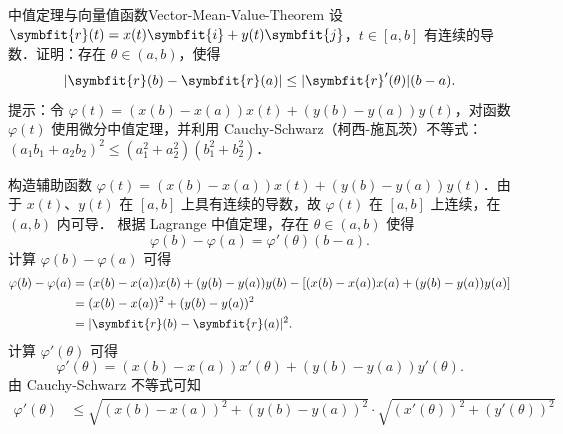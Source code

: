 \begin{problem}{中值定理与向量值函数}{Vector-Mean-Value-Theorem}
    设 $\symbfit{r}(t) = x(t)\symbfit{i} + y(t)\symbfit{j}$，$t \in [a, b]$ 有连续的导数．证明：存在 $\theta \in (a, b)$，使得
    \begin{equation}
        |\symbfit{r}(b) - \symbfit{r}(a)| \le |\symbfit{r}'(\theta)|(b - a). \label{eq:target-inequality}
    \end{equation}
    提示：令 $\varphi(t) = (x(b) - x(a))x(t) + (y(b) - y(a))y(t)$，对函数 $\varphi(t)$ 使用微分中值定理，并利用 Cauchy-Schwarz（柯西-施瓦茨）不等式：$(a_1b_1 + a_2b_2)^2 \le (a_1^2 + a_2^2)(b_1^2 + b_2^2)$．
\end{problem}

\begin{myproof}

    构造辅助函数 $\varphi(t) = (x(b) - x(a))x(t) + (y(b) - y(a))y(t)$．由于 $x(t)$、$y(t)$ 在 $[a, b]$ 上具有连续的导数，故 $\varphi(t)$ 在 $[a, b]$ 上连续，在 $(a, b)$ 内可导．
    根据 Lagrange 中值定理，存在 $\theta \in (a, b)$ 使得
    \begin{equation}
        \varphi(b) - \varphi(a) = \varphi'(\theta)(b - a). \label{eq:lagrange}
    \end{equation}
    计算 $\varphi(b) - \varphi(a)$ 可得
    \begin{equation}
        \begin{aligned}
            \varphi(b) - \varphi(a) & = (x(b) - x(a))x(b) + (y(b) - y(a))y(b) - \left[ (x(b) - x(a))x(a) + (y(b) - y(a))y(a) \right] \\
                                    & = (x(b) - x(a))^2 + (y(b) - y(a))^2                                                            \\
                                    & = |\symbfit{r}(b) - \symbfit{r}(a)|^2.
        \end{aligned} \label{eq:left-side}
    \end{equation}
    计算 $\varphi'(\theta)$ 可得
    \begin{equation}
        \varphi'(\theta) = (x(b) - x(a))x'(\theta) + (y(b) - y(a))y'(\theta). \label{eq:derivative}
    \end{equation}
    由 Cauchy-Schwarz 不等式可知
    \begin{equation}
        \begin{aligned}
            \varphi'(\theta) & \le \sqrt{(x(b) - x(a))^2 + (y(b) - y(a))^2} \cdot \sqrt{(x'(\theta))^2 + (y'(\theta))^2} \\

\end{aligned}
\end{equation}
\end{myproof}
